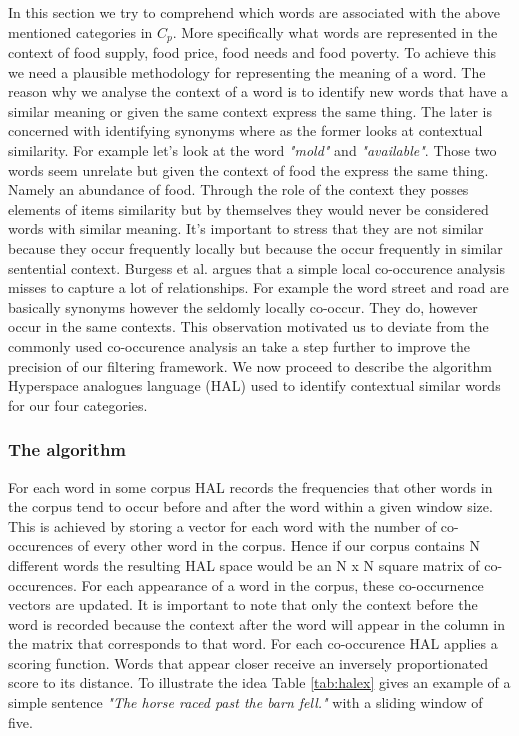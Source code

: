 \documentclass[12pt]{report}
\begin{document}
In this section we try to comprehend which words are associated with the above mentioned categories in $C_p$. More specifically what words are represented in the context of food supply, food price, food needs and food poverty. To achieve this we need a plausible methodology for representing the meaning of a word. The reason why we analyse the context of a word is to identify new words that have a similar meaning or given the same context express the same thing. The later is concerned with identifying synonyms where as the former looks at contextual similarity. For example let's look at the word \emph {"mold"} and  \emph {"available"}. Those two words seem unrelate but given the context of food the express the same thing.  Namely an abundance of food. Through the role  of the context they posses elements of items similarity but by themselves they would never be considered words with similar meaning. It's important to stress that they are not similar because they occur frequently locally but because the occur frequently in similar sentential context. Burgess et al. \cite{burgess98} argues that a simple local co-occurence analysis misses to capture a lot of relationships. For example the word street and road are basically synonyms however the seldomly locally co-occur. They do, however occur in the same contexts. This observation motivated us to deviate from the commonly used co-occurence analysis an take a step further to improve the precision of our filtering framework. We now proceed to describe the algorithm Hyperspace analogues language (HAL) \cite{lund96} used to identify contextual similar words for our four categories. 



\subsubsection{The algorithm}

For each word in some corpus HAL records the frequencies that other words in the corpus tend to occur before and after the word within a given window size. This is achieved  by storing a vector for each word with the number of co-occurences of every other word in the corpus. Hence if our corpus contains N different words the resulting HAL space would be an N x N square matrix of co-occurences. For each appearance of a word in the corpus, these co-occurnence vectors are updated. It is important to note that only the context before the word is recorded because the context after the word will appear in the column in the matrix that corresponds to that word. For each co-occurence HAL applies a scoring function. Words that appear closer receive an inversely proportionated score to its distance. To illustrate the idea Table \ref{tab:halex} gives an example of a simple sentence \emph {"The horse raced past the barn fell."} with a sliding window of five. 
\end{document}
